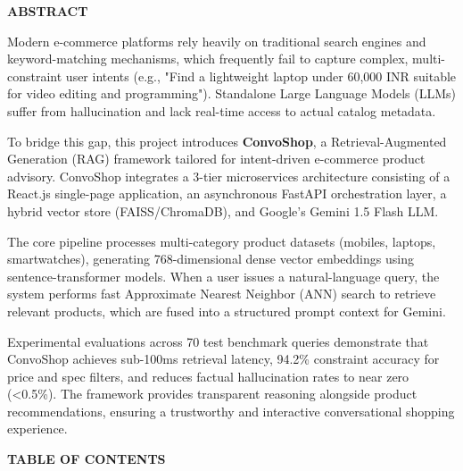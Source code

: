 \documentclass[12pt,a4paper]{article}
\begin{document}
\label{page:abstract}
\begin{center}
{\fontsize{16}{20}\bfseries\color{vtuBlue} ABSTRACT\\[12pt]}
\end{center}

Modern e-commerce platforms rely heavily on traditional search engines and keyword-matching mechanisms, which frequently fail to capture complex, multi-constraint user intents (e.g., "Find a lightweight laptop under 60,000 INR suitable for video editing and programming"). Standalone Large Language Models (LLMs) suffer from hallucination and lack real-time access to actual catalog metadata. 

To bridge this gap, this project introduces \textbf{ConvoShop}, a Retrieval-Augmented Generation (RAG) framework tailored for intent-driven e-commerce product advisory. ConvoShop integrates a 3-tier microservices architecture consisting of a React.js single-page application, an asynchronous FastAPI orchestration layer, a hybrid vector store (FAISS/ChromaDB), and Google's Gemini 1.5 Flash LLM.

The core pipeline processes multi-category product datasets (mobiles, laptops, smartwatches), generating 768-dimensional dense vector embeddings using sentence-transformer models. When a user issues a natural-language query, the system performs fast Approximate Nearest Neighbor (ANN) search to retrieve relevant products, which are fused into a structured prompt context for Gemini. 

Experimental evaluations across 70 test benchmark queries demonstrate that ConvoShop achieves sub-100ms retrieval latency, 94.2\% constraint accuracy for price and spec filters, and reduces factual hallucination rates to near zero (<0.5\%). The framework provides transparent reasoning alongside product recommendations, ensuring a trustworthy and interactive conversational shopping experience.

\newpage

\label{page:toc}
\begin{center}
{\fontsize{16}{20}\bfseries\color{vtuBlue} TABLE OF CONTENTS\\[10pt]}
\end{center}
\end{document}
